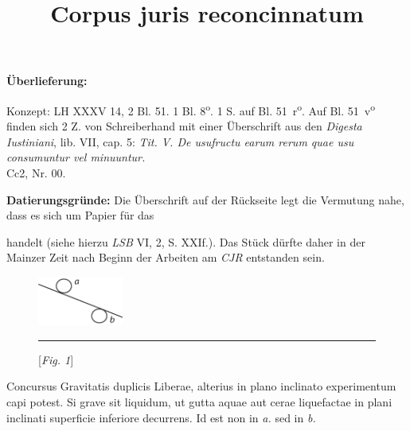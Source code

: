\begin{ledgroupsized}[r]{120mm}
\footnotesize
\pstart%
\noindent\textbf{\"{U}berlieferung:}%
\pend
\end{ledgroupsized}
%
\begin{ledgroupsized}[r]{114mm}
\footnotesize%
\pstart%
\parindent -6mm%
%
Konzept: LH XXXV 14, 2 Bl. 51. 1 Bl. 8\textsuperscript{o}. 1 S. auf Bl. 51~r\textsuperscript{o}.
Auf Bl. 51~v\textsuperscript{o} finden sich 2 Z. von Schreiberhand mit einer \"{U}berschrift aus den \textit{Digesta Iustiniani}, lib. VII, cap. 5:
\textit{Tit. V. De usufructu earum rerum quae usu consumuntur vel minuuntur.}\\%
Cc2, Nr. 00.
\pend
\end{ledgroupsized}
\vspace*{5mm}
\begin{ledgroup}
\footnotesize%
\pstart%
\noindent%
\footnotesize{\textbf{Datierungsgr\"{u}nde:}
Die \"{U}berschrift auf der R\"{u}ckseite legt die Vermutung nahe, dass es sich um Papier für das \title{Corpus juris reconcinnatum} handelt (siehe hierzu \textit{LSB} VI, 2, S. XXIf.). Das St\"{u}ck d\"{u}rfte daher in der Mainzer Zeit nach Beginn der Arbeiten am \textit{CJR} entstanden sein.}
\pend
\end{ledgroup}
%
\vspace*{8mm}
\pstart%
\noindent%
\normalsize%
% 
\begin{figure}                    
\includegraphics[width=0.25\textwidth]{images/lh0351402_51-d.pdf}\\
\rule[0cm]{14mm}{0cm}[\textit{Fig. 1}]\\                       
\end{figure}
Concursus Gravitatis duplicis  Liberae\protect{}, alterius in plano inclinato experimentum capi potest. Si grave\protect{} sit liquidum, ut gutta aquae aut cerae\protect{} liquefactae in plani inclinati\protect{} superficie inferiore decurrens. Id est non in \textit{a.} sed in \textit{b.}
